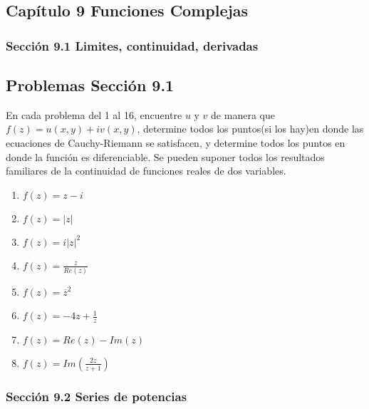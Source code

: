\documentclass[12pt,letterpaper]{article}
\author{Javier Said Naranjo Miranda}
\begin{document}
\subsection* {Cap\'itulo 9 Funciones Complejas}
	\subsubsection* {Secci\'on 9.1 Limites, continuidad, derivadas}
	\subsection* {Problemas Secci\'on 9.1}
\justify
En cada problema del 1 al 16, encuentre $u$ y $v$ de manera que $f(z) = u(x,y) + iv(x,y)$, determine todos los puntos(si los hay)en donde las ecuaciones de Cauchy-Riemann se satisfacen, y determine todos los puntos en donde la funci\'on es diferenciable. Se pueden suponer todos los resultados familiares de la continuidad de funciones reales de dos variables.
\begin{enumerate}
\item $f(z)= z-i$
\item $f(z)= |z|$
\item $f(z)= i|z|^2$
\item $f(z)= \frac{z}{Re(z)}$
\item $f(z)= \overline{z}^2$
\item $f(z)= -4z + \frac{1}{z}$
\item $f(z)= Re(z)-Im(z)$
\item $f(z)= Im(\frac{2z}{z+1})$

\end{enumerate}
	\subsubsection* {Secci\'on 9.2 Series de potencias}
\end{document}

